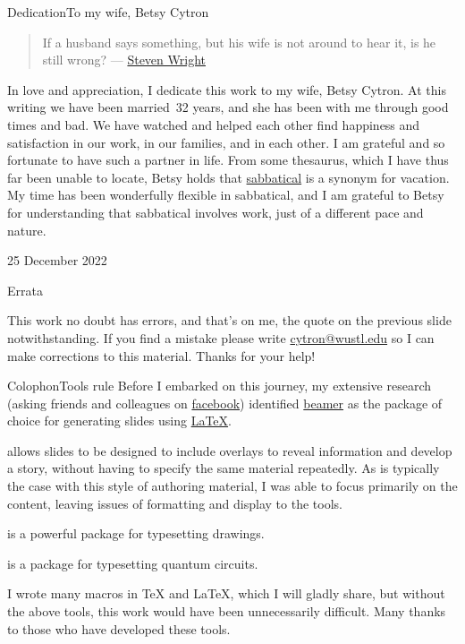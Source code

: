 \begin{frame}{Dedication}{To my wife, Betsy Cytron}
\begin{quote}
    If a husband says something, but his wife is not around to hear it, is he still wrong? --- \href{https://en.wikipedia.org/wiki/Steven_Wright}{Steven Wright}
\end{quote}
In love and appreciation, I dedicate this work to my wife, Betsy Cytron.  At this writing we have been married~32 years, and she has been with me through good times and bad. We have watched and helped each other find happiness and satisfaction in our work, in our families, and in each other.  I am grateful and so fortunate to have such a partner in life.
\SmallSkip{}
From some thesaurus, which I have thus far been unable to locate,  Betsy holds that \href{https://www.merriam-webster.com/dictionary/sabbatical}{sabbatical} is a synonym for vacation.  My time has been wonderfully flexible in sabbatical, and I am grateful to Betsy for understanding that sabbatical involves work, just of a different pace and nature.
\begin{flushright}25 December 2022\end{flushright}
\end{frame}
\begin{frame}{Errata}

This work no doubt has errors, and that's on me, the quote on the previous slide notwithstanding.  If you find a mistake please write \href{mailto:cytron@wustl.edu}{cytron@wustl.edu} so I can make corrections to this material.
\SmallSkip{}
Thanks for your help!
\end{frame}

\begin{frame}{Colophon}{Tools rule}
Before I embarked on this journey, my extensive research (asking friends and colleagues on \href{https://en.wikipedia.org/wiki/Facebook}{facebook}) identified \href{https://en.wikipedia.org/wiki/Beamer_(LaTeX)}{beamer} as the package of choice for generating slides using \href{https://en.wikibooks.org/wiki/LaTeX}{\LaTeX}.

\begin{description}[<+->]
  \item[beamer] allows slides to be designed to include overlays to reveal information and develop a story, without having to specify the same material repeatedly. As is typically the case with this style of authoring material, I was able to focus primarily on the content, leaving issues of formatting and display to the tools.
  \item[\href{https://en.wikibooks.org/wiki/LaTeX/PGF/TikZ}{tikz}] is a powerful package for typesetting drawings.
  \item[\href{https://ctan.org/pkg/quantikz?lang=en}{quantikz}] is a package for typesetting quantum circuits.
\end{description}
I wrote many macros in \TeX{} and \LaTeX{}, which I will gladly share, but without the above tools, this work would have been unnecessarily difficult.  Many thanks to those who have developed these tools.
\end{frame}

